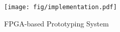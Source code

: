 \begin{figure}[t]
  \centering
  \texttt{[image: fig/implementation.pdf]}
  \vspace{-0.8cm}
  \caption{FPGA-based Prototyping System}
  \vspace{-0.7cm}
  \label{fig:implementation}
\end{figure}